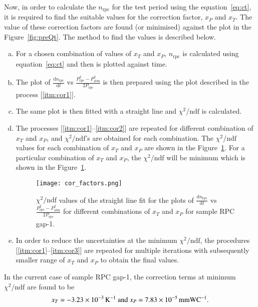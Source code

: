 Now, in order to calculate the $n_{\textrm{rpc}}$ for the test period using the
equation~\ref{eq:ct}, it is required to find the suitable values for the
correction factor, $x_P$ and $x_T$. The value of these correction factors are
found (or minimised) against the plot in the Figure~\ref{fig:preQt}. The method
to find the values is described below.
\begin{enumerate}[a.]
\item \label{itm:cor1} For a chosen combination of values of $x_T$ and $x_P$,
  $n_{\textrm{rpc}}$ is calculated using equation~\ref{eq:ct} and then is plotted
  against time.
\item The plot of $\frac{\mathrm{d}n_{\textrm{rpc}}}{\mathrm{d}t}$ vs
  $\frac{P_{\textrm{rpc}}^{2}-P_{\textrm{atm}}^{2}}{2P_{\textrm{rpc}}}$ is then prepared
  using the plot described in the process [\ref{itm:cor1}].
\item \label{itm:cor2} The same plot 
  is then fitted
  with a straight line and $\chi^2/\textrm{ndf}$ is calculated.
\item \label{itm:cor3} The processes [\ref{itm:cor1}--\ref{itm:cor2}] are
  repeated for different combination of $x_T$ and $x_P$, and
  $\chi^2/\textrm{ndf}$'s are obtained for each combination. The
  $\chi^2/\textrm{ndf}$ values for each combination of $x_T$ and $x_P$ are
  shown in the Figure~\ref{fig:xp}. For a particular combination of $x_T$ and
  $x_P$, the $\chi^2/\textrm{ndf}$ will be minimum which is shown in the
  Figure~\ref{fig:xp}.
  \begin{figure}[h]
    \centering
    \texttt{[image: cor\_factors.png]}
    \caption{$\chi^2/\textrm{ndf}$ values of the straight line fit for the
      plots of $\frac{\mathrm{d}n_{\textrm{rpc}}}{\mathrm{d}t}$ vs
      $\frac{P_{\textrm{rpc}}^{2}-P_{\textrm{atm}}^{2}}{2P_{\textrm{rpc}}}$ for different
      combinations of $x_T$ and $x_P$ for sample RPC gap-1.}
    \label{fig:xp}
  \end{figure}
\item In order to reduce the uncertainties at the minimum
  $\chi^2/\textrm{ndf}$, the procedures [\ref{itm:cor1}--\ref{itm:cor3}] are
  repeated for multiple iterations with subsequently smaller range of $x_T$
  and $x_P$ to obtain the final values.
\end{enumerate}

In the current case of sample RPC gap-1, the correction terms at minimum
$\chi^2/\textrm{ndf}$ are found to be
\[x_T=-3.23\times10^{-3}\textrm{\,K}^{-1}\textrm{ and }x_P=7.83\times10^{-5}\textrm{\,mmWC}^{-1}\textrm{.}\]

